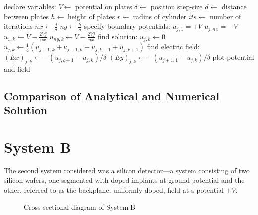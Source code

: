 \documentclass[12pt, a4paper]{article}
\begin{document}
\begin{algorithm}
\begin{algorithmic}[]
\State declare variables:
\State $V \gets$ potential on plates
\State $\delta \gets$ position step-size
\State $d \gets$ distance between plates
\State $h \gets$ height of plates
\State $r \gets$ radius of cylinder
\State $its \gets$ number of iterations
\State $nx \gets \frac{d}{\delta}$ 
\State $ny \gets \frac{h}{\delta}$ 
\State specify boundary potentials:
   \State $u_{j, 1} = +V$
   \State $u_{j, nx} = -V$
\EndFor
{}
   \State $u_{1, k} \gets V-\frac{2Vj}{nx}$
   \State $u_{ny, k} \gets V-\frac{2Vj}{nx}$
\EndFor
\State find solution:
            \State $u_{j, k} \gets 0$
         \Else
            \State $u_{j,k} \gets \frac{1}{4}(u_{j-1,k}+u_{j+1,k}+u_{j,k-1}+u_{j,k+1})$
         \EndIf
      \EndFor
   \EndFor
\EndFor
\State find electric field:
      \State $(Ex)_{j, k} \gets -\left(u_{j,k+1}-u_{j,k}\right)/\delta$
      \State $(Ey)_{j,k} \gets -\left(u_{j+1,1}-u_{j,k}\right)/\delta$
   \EndFor
\EndFor
\State plot potential and field
\EndProcedure
\end{algorithmic}
\end{algorithm}

\subsection{Comparison of Analytical and Numerical Solution}

\section{System B}

The second system considered was a silicon detector---a system consisting of two
silicon wafers, one segmented with doped implants at ground potential and the other,
referred to as the backplane, uniformly doped, held at a potential $+V$.

\begin{figure}[h!]
\begin{center}
\end{center}
\caption{Cross-sectional diagram of System B}
\end{figure}
\end{document}
